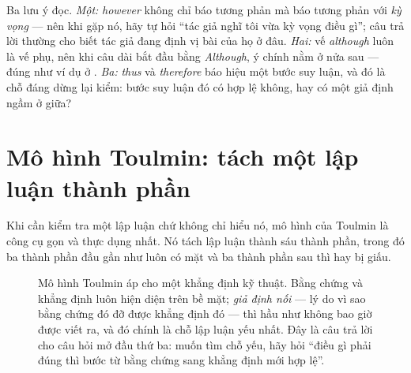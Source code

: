 \documentclass[../../english.tex]{subfiles}
\begin{document}
Ba lưu ý đọc. \emph{Một:} \emph{however} không chỉ báo tương phản mà báo tương phản với \emph{kỳ vọng} --- nên khi gặp nó, hãy tự hỏi ``tác giả nghĩ tôi vừa kỳ vọng điều gì''; câu trả lời thường cho biết tác giả đang định vị bài của họ ở đâu. \emph{Hai:} vế \emph{although} luôn là vế phụ, nên khi câu dài bắt đầu bằng \emph{Although}, ý chính nằm ở nửa sau --- đúng như ví dụ ở . \emph{Ba:} \emph{thus} và \emph{therefore} báo hiệu một bước suy luận, và đó là chỗ đáng dừng lại kiểm: bước suy luận đó có hợp lệ không, hay có một giả định ngầm ở giữa?

\section{Mô hình Toulmin: tách một lập luận thành phần}

Khi cần kiểm tra một lập luận chứ không chỉ hiểu nó, mô hình của Toulmin là công cụ gọn và thực dụng nhất. Nó tách lập luận thành sáu thành phần, trong đó ba thành phần đầu gần như luôn có mặt và ba thành phần sau thì hay bị giấu.

\begin{figure}[H]\centering
{}
\caption{Mô hình Toulmin áp cho một khẳng định kỹ thuật. Bằng chứng và khẳng định luôn hiện diện trên bề mặt; \emph{giả định nối} --- lý do vì sao bằng chứng đó đỡ được khẳng định đó --- thì hầu như không bao giờ được viết ra, và đó chính là chỗ lập luận yếu nhất. Đây là câu trả lời cho câu hỏi mở đầu thứ ba: muốn tìm chỗ yếu, hãy hỏi ``điều gì phải đúng thì bước từ bằng chứng sang khẳng định mới hợp lệ''.}
\label{fig:toulmin}
\end{figure}
\end{document}
